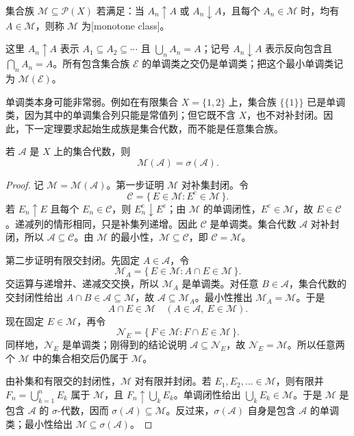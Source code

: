 \begin{definition}
\label{b1:def:monotone-class}
集合族 \(\mathcal M\subseteq\mathcal P(X)\) 若满足：当 \(A_n\uparrow A\) 或 \(A_n\downarrow A\)，且每个 \(A_n\in\mathcal M\) 时，均有 \(A\in\mathcal M\)，则称 \(\mathcal M\) 为[monotone class]。
\end{definition}

这里 \(A_n\uparrow A\) 表示 \(A_1\subseteq A_2\subseteq\cdots\) 且 \(\bigcup_nA_n=A\)；记号 \(A_n\downarrow A\) 表示反向包含且 \(\bigcap_nA_n=A\)。所有包含集合族 \(\mathcal E\) 的单调类之交仍是单调类；把这个最小单调类记为 \(\mathcal M(\mathcal E)\)。

\ProseParagraphBreak

单调类本身可能非常弱。例如在有限集合 \(X=\{1,2\}\) 上，集合族 \(\bigl\{\{1\}\bigr\}\) 已是单调类，因为其中的单调集合列只能是常值列；但它既不含 \(X\)，也不对补封闭。因此，下一定理要求起始生成族是集合代数，而不能是任意集合族。

\begin{theorem}[单调类]
\label{b1:thm:monotone-class}
若 \(\mathcal A\) 是 \(X\) 上的集合代数，则
\[
\mathcal M(\mathcal A)=\sigma(\mathcal A).
\]
\end{theorem}
\begin{proof}
记 \(\mathcal M=\mathcal M(\mathcal A)\)。第一步证明 \(\mathcal M\) 对补集封闭。令
\[
\mathcal C
=\{\,E\in\mathcal M:E^{\mathrm c}\in\mathcal M\,\}.
\]
若 \(E_n\uparrow E\) 且每个 \(E_n\in\mathcal C\)，则 \(E_n^{\mathrm c}\downarrow E^{\mathrm c}\)；由 \(\mathcal M\) 的单调闭性，\(E^{\mathrm c}\in\mathcal M\)，故 \(E\in\mathcal C\)。递减列的情形相同，只是补集列递增。因此 \(\mathcal C\) 是单调类。集合代数 \(\mathcal A\) 对补封闭，所以 \(\mathcal A\subseteq\mathcal C\)。由 \(\mathcal M\) 的最小性，\(\mathcal M\subseteq\mathcal C\)，即 \(\mathcal C=\mathcal M\)。

第二步证明有限交封闭。先固定 \(A\in\mathcal A\)，令
\[
\mathcal M_A
=\{\,E\in\mathcal M:A\cap E\in\mathcal M\,\}.
\]
交运算与递增并、递减交交换，所以 \(\mathcal M_A\) 是单调类。对任意 \(B\in\mathcal A\)，集合代数的交封闭性给出 \(A\cap B\in\mathcal A\subseteq\mathcal M\)，故 \(\mathcal A\subseteq\mathcal M_A\)。最小性推出 \(\mathcal M_A=\mathcal M\)。于是
\[
A\cap E\in\mathcal M
\quad(A\in\mathcal A,\ E\in\mathcal M).
\]
现在固定 \(E\in\mathcal M\)，再令
\[
\mathcal N_E
=\{\,F\in\mathcal M:F\cap E\in\mathcal M\,\}.
\]
同样地，\(\mathcal N_E\) 是单调类；刚得到的结论说明 \(\mathcal A\subseteq\mathcal N_E\)，故 \(\mathcal N_E=\mathcal M\)。所以任意两个 \(\mathcal M\) 中的集合相交后仍属于 \(\mathcal M\)。

由补集和有限交的封闭性，\(\mathcal M\) 对有限并封闭。若 \(E_1,E_2,\ldots\in\mathcal M\)，则有限并
\(
F_n=\bigcup_{k=1}^{n}E_k
\)
属于 \(\mathcal M\)，且 \(F_n\uparrow\bigcup_kE_k\)。单调闭性给出 \(\bigcup_kE_k\in\mathcal M\)。于是 \(\mathcal M\) 是包含 \(\mathcal A\) 的 \(\sigma\)-代数，因而 \(\sigma(\mathcal A)\subseteq\mathcal M\)。反过来，\(\sigma(\mathcal A)\) 自身是包含 \(\mathcal A\) 的单调类；最小性给出 \(\mathcal M\subseteq\sigma(\mathcal A)\)。
\end{proof}

